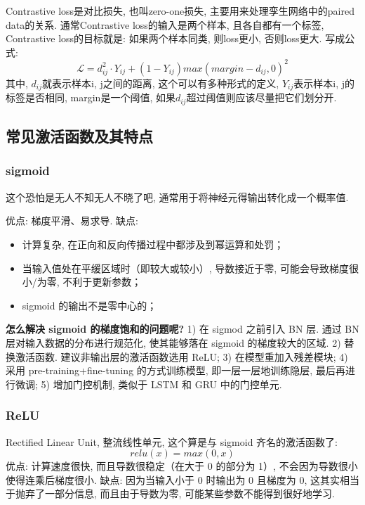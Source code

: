 Contrastive loss是对比损失, 也叫zero-one损失, 主要用来处理孪生网络中的paired data的关系. 通常Contrastive loss的输入是两个样本, 且各自都有一个标签, Contrastive loss的目标就是: 如果两个样本同类, 则loss更小, 否则loss更大. 写成公式: 
$$
\mathcal{L} = d_{ij}^2 \cdot Y_{ij} + (1 - Y_{ij} )max(margin - d_{ij}, 0)^2
$$
其中, $d_{ij}$就表示样本i, j之间的距离, 这个可以有多种形式的定义, $Y_{ij}$表示样本i, j的标签是否相同, margin是一个阈值, 如果$d_{ij}$超过阈值则应该尽量把它们划分开. 

\subsection{常见激活函数及其特点}
\subsubsection{sigmoid}
\begin{center}
\end{center}
这个恐怕是无人不知无人不晓了吧, 通常用于将神经元得输出转化成一个概率值. 

优点: 梯度平滑、易求导. 缺点: 
\begin{itemize}
	\item 计算复杂, 在正向和反向传播过程中都涉及到幂运算和处罚；
	
	\item 当输入值处在平缓区域时（即较大或较小）, 导数接近于零, 可能会导致梯度很小/为零, 不利于更新参数；
	
	\item sigmoid 的输出不是零中心的；
\end{itemize}

\textbf{怎么解决 sigmoid 的梯度饱和的问题呢?} 1) 在 sigmod 之前引入 BN 层. 通过 BN 层对输入数据的分布进行规范化, 使其能够落在 sigmoid 的梯度较大的区域. 2) 替换激活函数. 建议非输出层的激活函数选用 ReLU; 3) 在模型重加入残差模块; 4) 采用 pre-training+fine-tuning 的方式训练模型, 即一层一层地训练隐层, 最后再进行微调; 5) 增加门控机制, 类似于 LSTM 和 GRU 中的门控单元.

\subsubsection{ReLU}
Rectified Linear Unit, 整流线性单元, 这个算是与 sigmoid 齐名的激活函数了: 
$$
relu(x) = max(0, x)
$$
优点: 计算速度很快, 而且导数很稳定（在大于 0 的部分为 1）, 不会因为导数很小使得连乘后梯度很小. 缺点: 因为当输入小于 0 时输出为 0 且梯度为 0, 这其实相当于抛弃了一部分信息, 而且由于导数为零, 可能某些参数不能得到很好地学习. 

